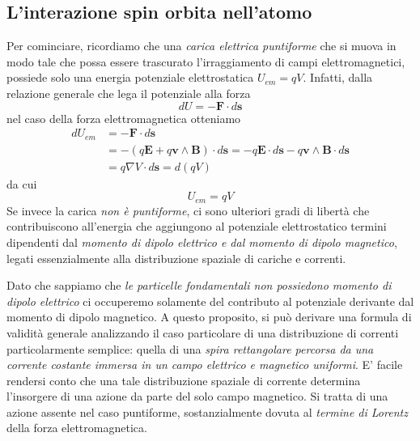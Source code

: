 \subsection{L'interazione spin orbita nell'atomo}\label{sec:spin-orbita-atomo}
Per cominciare, ricordiamo che una \emph{carica elettrica puntiforme} che si muova in modo tale che possa essere trascurato l’irraggiamento di campi elettromagnetici, possiede solo una energia potenziale elettrostatica $U_{em} = qV$. Infatti, dalla relazione generale che lega il potenziale alla forza
\[
dU = - \bm{F} \cdot d \bm{s}
\]
nel caso della forza elettromagnetica otteniamo
\begin{align*}
	dU_{em} &= - \bm{F} \cdot d \bm{s} \\
	& = - (q \bm{E} + q \bm{v} \wedge \bm{B}) \cdot d \bm{s}
	= - q \bm{E} \cdot d \bm{s} - q \bm{v} \wedge \bm{B} \cdot d \bm{s} \\
	& = q \nabla V \cdot d \bm{s} = d(qV)
\end{align*}
da cui
\begin{equation}
	U_{em} = qV
	\label{eq:potential-energy-electrostatic}
\end{equation}
Se invece la carica \emph{non è puntiforme}, ci sono ulteriori gradi di libertà che contribuiscono all’energia che aggiungono al potenziale elettrostatico termini dipendenti dal \emph{momento di dipolo elettrico e dal momento di dipolo magnetico}, legati essenzialmente alla distribuzione spaziale di cariche e correnti.

Dato che sappiamo che \emph{le particelle fondamentali non possiedono momento di dipolo elettrico} ci occuperemo solamente del contributo al potenziale derivante dal momento di dipolo magnetico.
A questo proposito, si può derivare una formula di validità generale analizzando il caso particolare di una distribuzione di correnti particolarmente semplice: quella di una \emph{spira rettangolare percorsa da una corrente costante immersa in un campo elettrico e magnetico uniformi}. E’ facile rendersi conto che una tale distribuzione spaziale di corrente determina l’insorgere di una azione da parte del solo campo magnetico. Si tratta di una azione assente nel caso puntiforme, sostanzialmente dovuta al \emph{termine di Lorentz} della forza elettromagnetica.

